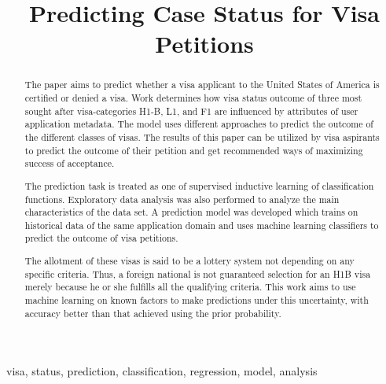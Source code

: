 \documentclass[conference]{IEEEtran}
\begin{document}
\title{Predicting Case Status for Visa Petitions\\}

\author{
\and
{}
\and
{}
}

\maketitle

\begin{abstract}
The paper aims to predict whether a visa applicant to the United States of America is certified or denied a visa. Work determines how visa status outcome of three most sought
after visa-categories H1-B, L1, and F1 are influenced by attributes of user application metadata. The model uses different approaches to predict the outcome of the different classes of visas. The results of this paper can be utilized by visa aspirants to predict the outcome of their petition and get recommended ways of maximizing success of acceptance.


The prediction task is treated as one of supervised inductive
learning of classification functions. Exploratory data analysis was also performed to analyze the
main characteristics of the data set. A prediction model was developed which trains on historical
data of the same application domain and uses machine learning classifiers to predict the outcome
of visa petitions.

The allotment of these visas is said to be a lottery system not
depending on any specific criteria. Thus, a foreign national is not guaranteed selection for an H1B visa merely because he or she fulfills all the qualifying criteria. This work aims to use machine learning on known factors to make predictions under this uncertainty, with accuracy better than that achieved using the prior probability.

\end{abstract}

\begin{IEEEkeywords}
visa, status, prediction, classification,
regression, model, analysis
\end{IEEEkeywords}
\end{document}

